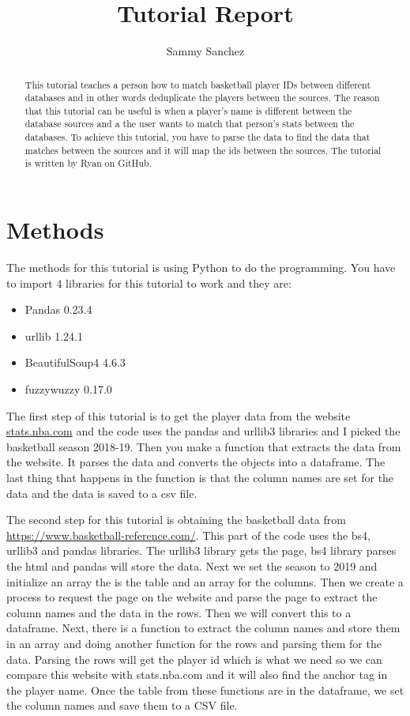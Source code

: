 \documentclass[10pt,twocolumn]{article}
\title{Tutorial Report}
\author{Sammy Sanchez}
\affiliation{Occidental College}
\begin{document}
\maketitle

\begin{abstract}

This tutorial teaches a person how to match basketball player IDs between different databases and in other words deduplicate the players between the sources. The reason that this tutorial can be useful is when a player's name is different between the database sources and a the user wants to match that person's stats between the databases. To achieve this tutorial, you have to parse the data to find the data that matches between the sources and it will map the ids between the sources. The tutorial is written by Ryan \textcite{Tutorial} on GitHub.

\end{abstract}

\section{Methods}
The methods for this tutorial is using Python to do the programming. You have to import 4 libraries for this tutorial to work and they are:

\begin{itemize}
    \item Pandas 0.23.4
    \item urllib 1.24.1
    \item BeautifulSoup4 4.6.3
    \item fuzzywuzzy 0.17.0
\end{itemize}

The first step of this tutorial is to get the player data from the website \url{stats.nba.com} and the code uses the pandas and urllib3 libraries and I picked the basketball season 2018-19. Then you make a function that extracts the data from the website. It parses the data and converts the objects into a dataframe. The last thing that happens in the function is that the column names are set for the data and the data is saved to a csv file.

The second step for this tutorial is obtaining the basketball data from \url{https://www.basketball-reference.com/}. This part of the code uses the bs4, urllib3 and pandas libraries. The urllib3 library gets the page, bs4 library parses the html and pandas will store the data. Next we set the season to 2019 and initialize an array the is the table and an array for the columns. Then we create a process to request the page on the website and parse the page to extract the column names and the data in the rows. Then we will convert this to a dataframe. Next, there is a function to extract the column names and store them in an array and doing another function for the rows and parsing them for the data. Parsing the rows will get the player id which is what we need so we can compare this website with stats.nba.com and it will also find the anchor tag in the player name. Once the table from these functions are in the dataframe, we set the column names and save them to a CSV file.
\end{document}
